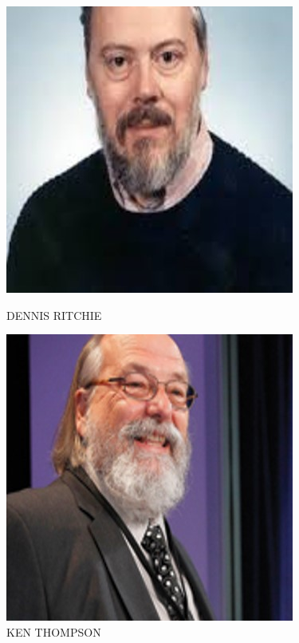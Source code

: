 \documentclass{article}
\begin{document}
\begin{figure}[h!]
	\begin{minipage}{0.37\textwidth}
		\centering
		\includegraphics[width=1.5\linewidth]{"DENNIS 2"}
		\caption{DENNIS RITCHIE}
	\end{minipage}\hfill
\begin{minipage}{0.37\textwidth}
	\includegraphics[width=1.5\linewidth]{"KEN"}
		\caption{KEN THOMPSON}
\end{minipage}
\end{figure}
\end{document}
